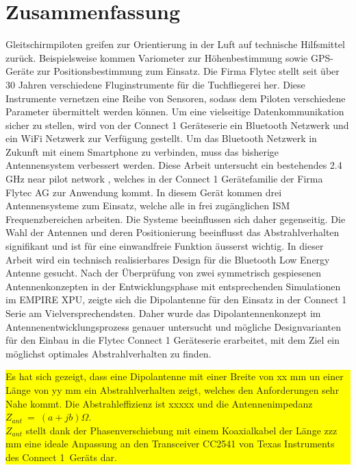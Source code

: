 \newpage
\section*{Zusammenfassung}

Gleitschirmpiloten greifen zur Orientierung in der Luft auf technische Hilfsmittel zurück. Beispielsweise kommen Variometer zur Höhenbestimmung sowie GPS-Geräte zur Positionsbestimmung zum Einsatz. Die Firma Flytec stellt seit über 30 Jahren verschiedene Fluginstrumente für die Tuchfliegerei her. Diese Instrumente vernetzen eine Reihe von Sensoren, sodass dem Piloten verschiedene Parameter übermittelt werden können. Um eine vielseitige Datenkommunikation sicher zu stellen, wird von der \glqq Connect 1 \grqq Geräteserie ein Bluetooth Netzwerk und ein WiFi Netzwerk zur Verfügung gestellt. Um das Bluetooth Netzwerk in Zukunft mit einem Smartphone zu verbinden, muss das bisherige Antennensystem verbessert werden.
Diese Arbeit untersucht ein bestehendes 2.4 GHz \glqq near pilot network \grqq , welches in der \glqq Connect 1 \grqq Gerätefamilie der Firma Flytec AG zur Anwendung kommt. 
In diesem  Gerät kommen drei Antennensysteme zum Einsatz, welche alle in frei zugänglichen ISM Frequenzbereichen arbeiten. Die Systeme beeinflussen sich daher gegenseitig. Die Wahl der Antennen und deren Positionierung beeinflusst das Abstrahlverhalten signifikant und ist für eine einwandfreie Funktion äusserst wichtig. In dieser Arbeit wird ein technisch realisierbares Design für die \glqq Bluetooth Low Energy \grqq Antenne gesucht.  
Nach der Überprüfung von zwei symmetrisch gespiesenen Antennenkonzepten in der Entwicklungsphase mit entsprechenden Simulationen im EMPIRE XPU, zeigte sich die Dipolantenne für den Einsatz in der  \glqq Connect 1 \grqq Serie am Vielversprechendsten.
 Daher wurde das Dipolantennenkonzept im Antennenentwicklungsprozess genauer untersucht und mögliche Designvarianten für den Einbau in die Flytec \glqq Connect 1 \grqq Geräteserie
  erarbeitet, mit dem Ziel ein möglichst optimales Abstrahlverhalten zu finden.\\
  \colorbox{yellow}{\parbox[t]{\textwidth}{Es hat sich gezeigt, dass eine Dipolantenne mit einer Breite von xx mm un einer Länge von yy mm 
   ein Abstrahlverhalten zeigt, welches den Anforderungen sehr Nahe kommt. 
   Die Abstrahleffizienz ist xxxxx und die Antennenimpedanz  $Z_{ant}\ = \ (a+jb)\Omega$. \\
   $Z_{ant}$ stellt dank der Phasenverschiebung  mit einem  Koaxialkabel der Länge zzz mm eine ideale Anpassung  an den Transceiver CC2541 von Texas Instruments des \glqq Connect 1\grqq  \ Geräts dar.}}

